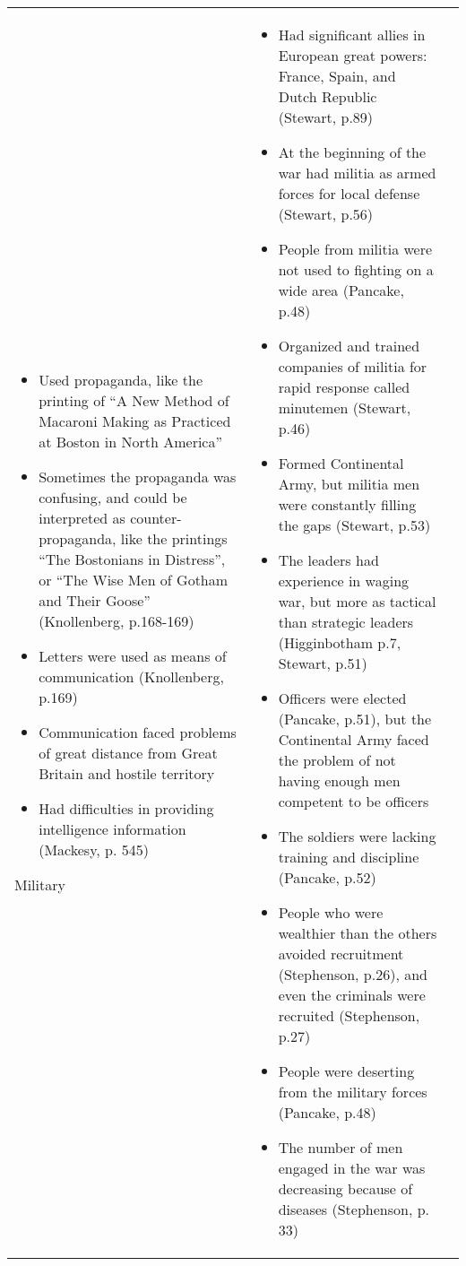 \begin{singlespace}
\begin{xtabular}{lp{2.7in}p{2.7in}}
\begin{itemize}[nolistsep,leftmargin=*]
	    \item  Used propaganda, like the printing of  “A New Method of
	      Macaroni Making as Practiced at Boston in North America”
	    \item  Sometimes the propaganda was confusing, and could be
	      interpreted as counter-propaganda, like the printings “The
	      Bostonians in Distress”, or “The Wise Men of Gotham and Their
	      Goose” (Knollenberg, p.168-169)
	    \item  Letters were used as means of communication (Knollenberg,
	      p.169)
	    \item  Communication faced problems of great distance from Great
	      Britain and hostile territory
	    \item  Had difficulties in providing intelligence information
	      (Mackesy, p. 545)
	\end{itemize}\NN{}
	Military & 
	\begin{itemize}[nolistsep,leftmargin=*]
	    \item  Had significant allies in European great powers: France, Spain, and Dutch Republic (Stewart, p.89) 
	    \item  At the beginning of the war had militia as armed forces for local defense (Stewart, p.56) 
	    \item  People from militia were not used to fighting on a wide area (Pancake, p.48) 
	    \item  Organized and trained companies of militia for rapid response called minutemen (Stewart, p.46) 
	    \item  Formed Continental Army, but militia men were constantly filling the gaps (Stewart, p.53) 
	    \item  The leaders had experience in waging war, but more as tactical than strategic leaders (Higginbotham p.7, Stewart, p.51) 
	    \item  Officers were elected (Pancake, p.51), but the Continental Army faced the problem of not having enough men competent to be officers 
	    \item  The soldiers were lacking training and discipline (Pancake, p.52) 
	    \item  People who were wealthier than the others avoided recruitment (Stephenson, p.26), and even the criminals were recruited (Stephenson, p.27) 
	    \item  People were deserting from the military forces (Pancake, p.48) 
	    \item  The number of men engaged in the war was decreasing because of diseases (Stephenson, p. 33) 

\end{itemize}
\end{xtabular}
\end{singlespace}
